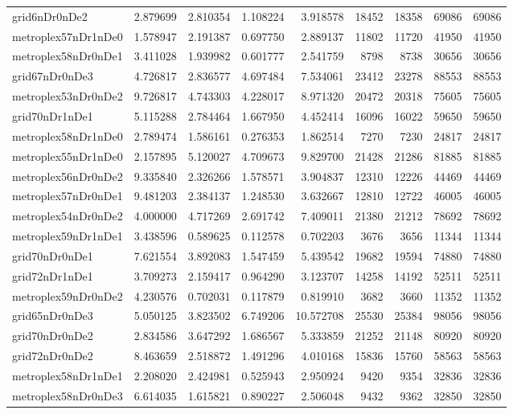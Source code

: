 \begin{longtable}{|l|r|r|r|r|r|r|r|r|}
grid6nDr0nDe2 & 2.879699 & 2.810354 & 1.108224 & 3.918578 & 18452 & 18358 & 69086 & 69086 \\
metroplex57nDr1nDe0 & 1.578947 & 2.191387 & 0.697750 & 2.889137 & 11802 & 11720 & 41950 & 41950 \\
metroplex58nDr0nDe1 & 3.411028 & 1.939982 & 0.601777 & 2.541759 & 8798 & 8738 & 30656 & 30656 \\
grid67nDr0nDe3 & 4.726817 & 2.836577 & 4.697484 & 7.534061 & 23412 & 23278 & 88553 & 88553 \\
metroplex53nDr0nDe2 & 9.726817 & 4.743303 & 4.228017 & 8.971320 & 20472 & 20318 & 75605 & 75605 \\
grid70nDr1nDe1 & 5.115288 & 2.784464 & 1.667950 & 4.452414 & 16096 & 16022 & 59650 & 59650 \\
metroplex58nDr1nDe0 & 2.789474 & 1.586161 & 0.276353 & 1.862514 & 7270 & 7230 & 24817 & 24817 \\
metroplex55nDr1nDe0 & 2.157895 & 5.120027 & 4.709673 & 9.829700 & 21428 & 21286 & 81885 & 81885 \\
metroplex56nDr0nDe2 & 9.335840 & 2.326266 & 1.578571 & 3.904837 & 12310 & 12226 & 44469 & 44469 \\
metroplex57nDr0nDe1 & 9.481203 & 2.384137 & 1.248530 & 3.632667 & 12810 & 12722 & 46005 & 46005 \\
metroplex54nDr0nDe2 & 4.000000 & 4.717269 & 2.691742 & 7.409011 & 21380 & 21212 & 78692 & 78692 \\
metroplex59nDr1nDe1 & 3.438596 & 0.589625 & 0.112578 & 0.702203 & 3676 & 3656 & 11344 & 11344 \\
grid70nDr0nDe1 & 7.621554 & 3.892083 & 1.547459 & 5.439542 & 19682 & 19594 & 74880 & 74880 \\
grid72nDr1nDe1 & 3.709273 & 2.159417 & 0.964290 & 3.123707 & 14258 & 14192 & 52511 & 52511 \\
metroplex59nDr0nDe2 & 4.230576 & 0.702031 & 0.117879 & 0.819910 & 3682 & 3660 & 11352 & 11352 \\
grid65nDr0nDe3 & 5.050125 & 3.823502 & 6.749206 & 10.572708 & 25530 & 25384 & 98056 & 98056 \\
grid70nDr0nDe2 & 2.834586 & 3.647292 & 1.686567 & 5.333859 & 21252 & 21148 & 80920 & 80920 \\
grid72nDr0nDe2 & 8.463659 & 2.518872 & 1.491296 & 4.010168 & 15836 & 15760 & 58563 & 58563 \\
metroplex58nDr1nDe1 & 2.208020 & 2.424981 & 0.525943 & 2.950924 & 9420 & 9354 & 32836 & 32836 \\
metroplex58nDr0nDe3 & 6.614035 & 1.615821 & 0.890227 & 2.506048 & 9432 & 9362 & 32850 & 32850 \\

\end{longtable}
